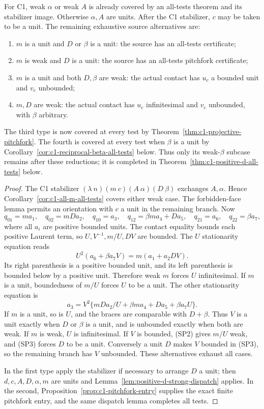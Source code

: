 \begin{proposition}
\label{prop:c1-positive-d-partition}
For C1, weak $\alpha$ or weak $A$ is already covered by an all-tests
theorem and its stabilizer image. Otherwise $\alpha,A$ are units.
After the C1 stabilizer, $c$ may be taken to be a unit. The remaining
exhaustive source alternatives are:
\begin{enumerate}
\item $m$ is a unit and $D$ or $\beta$ is a unit: the source has
an all-tests certificate;
\item $m$ is weak and $D$ is a unit: the source has an all-tests
pitchfork certificate;
\item $m$ is a unit and both $D,\beta$ are weak: the actual contact
has $u_c$ a bounded unit and $v_c$ unbounded;
\item $m,D$ are weak: the actual contact has $u_c$ infinitesimal
and $v_c$ unbounded, with $\beta$ arbitrary.
\end{enumerate}
The third type is now covered at every test by
Theorem~\ref{thm:c1-projective-pitchfork}. The fourth is covered at
every test when $\beta$ is a unit by
Corollary~\ref{cor:c1-reciprocal-beta-all-tests} below. Thus only its
weak-$\beta$ subcase remains after these reductions; it is completed
in Theorem~\ref{thm:c1-positive-d-all-tests} below.
\end{proposition}
\begin{proof}
The C1 stabilizer
$(\lambda\ n)(m\ c)(A\ \alpha)(D\ \beta)$ exchanges $A,\alpha$.
Hence Corollary~\ref{cor:c1-all-m-all-tests} covers either weak
case. The forbidden-face lemma permits an orientation with $c$ a
unit in the remaining branch. Now
\[
 q_{01}=ma_1,\quad q_{02}=mDa_2,\quad q_{10}=a_3,
 \quad q_{12}=\beta m a_4+Da_5,\quad q_{21}=a_6,
 \quad q_{22}=\beta a_7,
\]
where all $a_i$ are positive bounded units. The contact equality
bounds each positive Laurent term, so $U,V^{-1},m/U,DV$ are bounded.
The $U$ stationarity equation reads
\[
 U^2(a_6+\beta a_7V)=m(a_1+a_2DV).               \tag{SP2}
\]
Its right parenthesis is a positive bounded unit, and its left
parenthesis is bounded below by a positive unit. Therefore weak
$m$ forces $U$ infinitesimal. If $m$ is a unit, boundedness of
$m/U$ forces $U$ to be a unit. The other stationarity equation is
\[
 a_3=V^2\{mDa_2/U+\beta ma_4+Da_5+\beta a_7U\}. \tag{SP3}
\]
If $m$ is a unit, so is $U$, and the braces are comparable with
$D+\beta$. Thus $V$ is a unit exactly when $D$ or $\beta$ is a
unit, and is unbounded exactly when both are weak. If $m$ is weak,
$U$ is infinitesimal. If $V$ is bounded, (SP2) gives $m/U$ weak,
and (SP3) forces $D$ to be a unit. Conversely a unit $D$ makes
$V$ bounded in (SP3), so the remaining branch has $V$ unbounded.
These alternatives exhaust all cases.

In the first type apply the stabilizer if necessary to arrange
$D$ a unit; then $d,c,A,D,\alpha,m$ are units and
Lemma~\ref{lem:positive-d-strong-dispatch} applies. In the second,
Proposition~\ref{prop:c1-pitchfork-entry} supplies the exact finite
pitchfork entry, and the same dispatch lemma completes all tests.
\end{proof}

